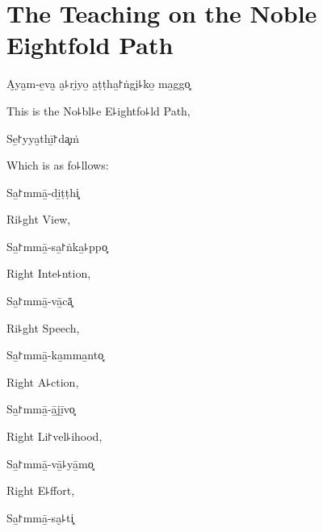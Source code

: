 \chapter[The Noble Eightfold Path]{The Teaching on the Noble Eightfold Path}


\begin{leader}
\end{leader}

A̮ya̮m-e̱va̮ a̮꜕ri̮yo̱ a̱ṭṭha̱꜓ṅgi̮꜕ko̱ ma̱ggo͓

\begin{english}
  This is the No꜕bl꜕e E꜕ightfo꜕ld Path,
\end{english}

Se̱꜓yya̮thī̱꜓da͓ṁ

\begin{english}
  Which is as fo꜕llows:
\end{english}

Sa̱꜓mmā̱-di̱ṭṭhi͓

\begin{english}
  Ri꜕ght View,
\end{english}

Sa̱꜓mmā̱-sa̱꜓ṅka̱꜕ppo͓

\begin{english}
  Right Inte꜕ntion,
\end{english}

Sa̱꜓mmā̱-vā̱cā͓

\begin{english}
  Ri꜕ght Speech,
\end{english}

Sa̱꜓mmā̱-ka̱mma̱nto͓

\begin{english}
  Right A꜕ction,
\end{english}

Sa̱꜓mmā̱-ā̱jī̱vo͓

\begin{english}
  Right Li꜓vel꜕ihood,
\end{english}

Sa̱꜓mmā̱-vā̱꜕yā̱mo͓

\begin{english}
  Right E꜕ffort,
\end{english}

\ifaivedition
\clearpage
\fi

Sa̱꜓mmā̱-sa̮꜕ti͓

